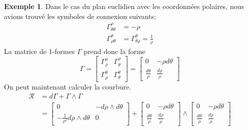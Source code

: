 \documentclass[a4paper,11pt]{report}
\theoremstyle{definition}
\theoremstyle{plain}
\theoremstyle{definition}
\newtheorem{exmp}{Exemple}[chapter]
\theoremstyle{remark}
\begin{document}
                \begin{exmp}
                    Dans le cas du plan euclidien avec les coordonnées polaires, nous avions trouvé les symboles de connexion suivants:
                    \begin{align}
                            \Gamma^\rho_{\theta\theta} &= -\rho\\
                            \Gamma^\theta_{\rho\theta} &= \Gamma^\theta_{\theta\rho} = \frac{1}{\rho}
                    \end{align}
                    La matrice de $1$-formes $\Gamma$ prend donc la forme
                    \begin{equation}
                        \Gamma =
                        \begin{bmatrix}
                            \Gamma^\rho_\rho & \Gamma^\rho_\theta \\
                            \Gamma^\theta_\rho & \Gamma^\theta_\theta
                        \end{bmatrix}
                         = 
                         \begin{bmatrix}
                            0 & -\rho d\theta \\
                            \frac{d\theta}{\rho} & \frac{d\rho}{\rho}
                        \end{bmatrix}
                    \end{equation}
                    On peut maintenant calculer la courbure.
                    \begin{align}
                        \mathscr{R} &= d\Gamma+\Gamma\wedge\Gamma \\
                        &= \begin{bmatrix}
                            0 & -d\rho\wedge d\theta \\
                            -\frac{1}{\rho^2}d\rho\wedge d\theta & 0
                        \end{bmatrix}+
                        \begin{bmatrix}
                            0 & -\rho d\theta \\
                            \frac{d\theta}{\rho} & \frac{d\rho}{\rho}
                        \end{bmatrix}\wedge
                        \begin{bmatrix}
                            0 & -\rho d\theta \\
                            \frac{d\theta}{\rho} & \frac{d\rho}{\rho}

\end{bmatrix}
\end{align}
\end{exmp}
\end{document}
